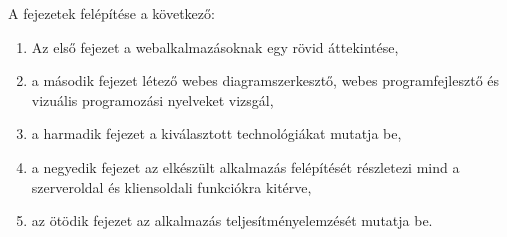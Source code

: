 \clearpage
A fejezetek felépítése a következő:

\begin{enumerate}
\item Az első fejezet a webalkalmazásoknak egy rövid áttekintése, 
\item a második fejezet létező webes diagramszerkesztő, webes programfejlesztő és vizuális programozási nyelveket vizsgál,
\item a harmadik fejezet a kiválasztott technológiákat mutatja be,
\item a negyedik fejezet az elkészült alkalmazás felépítését részletezi mind a szerveroldal és kliensoldali funkciókra kitérve,
\item az ötödik fejezet az alkalmazás teljesítményelemzését mutatja be.
\end{enumerate}